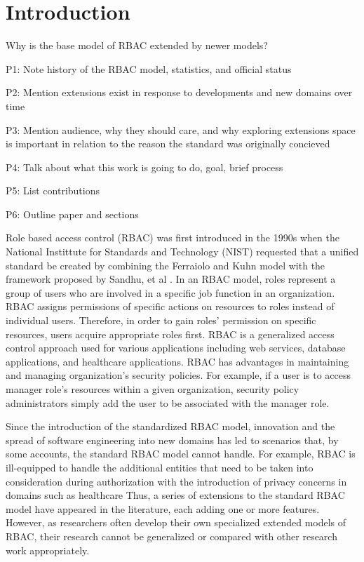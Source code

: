 \section{Introduction} \label{sec:introduction}

Why is the base model of RBAC extended by newer models?

P1: Note history of the RBAC model, statistics, and official status

P2: Mention extensions exist in response to developments and new domains over time

P3: Mention audience, why they should care, and why exploring extensions space is important in relation to the reason the standard was originally concieved

P4: Talk about what this work is going to do, goal, brief process

P5: List contributions

P6: Outline paper and sections


Role based access control (RBAC) was first introduced in the 1990s when the National Instittute for Standards and Technology (NIST) requested that a unified standard be created by combining the Ferraiolo and Kuhn model \cite{ferraiolokuhn} with the framework proposed by Sandhu, et al \cite{sandhu1996role}.  In an RBAC model, roles represent a group of users who are involved in a specific job function in an organization. RBAC assigns permissions of specific actions on resources to roles instead of individual users.  Therefore, in order to gain roles' permission on specific resources, users acquire appropriate roles first.  RBAC is a generalized access control approach used for various applications including web services, database applications, and healthcare applications.  RBAC has advantages in maintaining and managing organization's security policies.  For example, if a user is to access manager role's resources within a given organization, security policy administrators simply add the user to be associated with the manager role.

Since the introduction of the standardized RBAC model, innovation and the spread of software engineering into new domains has led to scenarios that, by some accounts, the standard RBAC model cannot handle.  For example, RBAC is ill-equipped to handle the additional entities that need to be taken into consideration during authorization with the introduction of privacy concerns in domains such as healthcare  Thus, a series of extensions to the standard RBAC model have appeared in the literature, each adding one or more features.  However, as researchers often develop their own specialized extended models of RBAC, their research cannot be generalized or compared with other research work appropriately.

